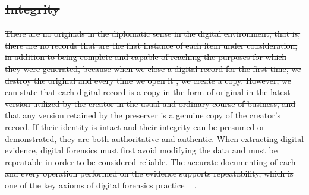 \documentclass[final]{vutinfth}
\providecommand{\DIFdeltex}[1]{{\protect\color{red}\sout{#1}}}                      %
\providecommand{\DIFdel}[1]{\texorpdfstring{\DIFdeltex{#1}}{}} %
\begin{document}
\subsection{\DIFdel{Integrity}}
\addtocounter{subsection}{-1}%
\DIFdel{There are no originals in the diplomatic sense in the digital environment, that is, there are no records that are the first instance of each item under consideration, in addition to being complete and capable of reaching the purposes for which they were generated, because when we close a digital record for the first time, we destroy the original and every time we open it , we create a copy. However, we can state that each digital record is a copy in the form of original in the latest version utilized by the creator in the usual and ordinary course of business, and that any version retained by the preserver is a genuine copy of the creator's record.
If their identity is intact and their integrity can be presumed or demonstrated, they are both authoritative and authentic. When extracting digital evidence, digital forensics must first avoid modifying the data and must be repeatable in order to be considered reliable. The accurate documenting of each and every operation performed on the evidence supports repeatability, which is one of the key axioms of digital forensics practice \mbox{%
\cite[58]{duranti2009digital}}\hskip0pt%
. 
}%
\end{document}
